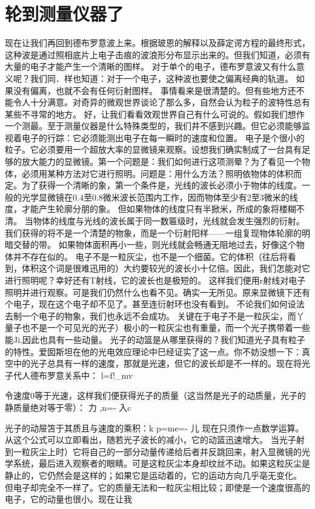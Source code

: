 \section{轮到测量仪器了}

现在让我们再回到德布罗意波上来。根据玻恩的解释以及薛定谔方程的最终形式，这种波是通过照相底片上电子击痕的波浪形分布显示出来的。但我们知道，必须有大量的电子才能产生一个清晰的图样。
对于单个的电子，德布罗意波又有什么意义呢？我们同．样也知道：对于一个电子，这种波也要使之偏离经典的轨道。
如果没有偏离，也就不会有任何衍射图样。
事情看来是很清楚的。但有些地方还不能令人十分满意。对奇异的微观世界谈论了那么多，自然会认为粒子的波特性总有某些不寻常的地方。
好，让我们看看效观世界自己有什么可说的。假如我们想作一个测最。至于测量仪器是什么特殊类型的，我们井不感到兴趣。但它必须能够监视着电子的行踪：它必须能测出电子在每一瞬时的速度和位置。
电子是个很小的粒子。它必须要用一个超放大率的显微镜来观察。设想我们确实制成了一台具有足够的放大能力的显微镜。第一个问题是：我们如何进行这项测晕？为了看见一个物体，必须用某种方法对它进行照明。问题是：用什么方法？照明依物体的体积而定。为了获得一个清晰的象，第一个条件是，光线的波长必须小于物体的线度。一般的光学显微镜在0.4至0.8微米波长范围内工作，因而物体至少有2至3微米的线度，才能产生轮廓分朋的象。
但如果物体的线度只有半掀米，所成的象将楼糊不清。
当物体的线度与光线的波长属于同一数匾级时，光线就会发生强烈的衍射。我们获得的将不是一个清楚的物象，而是一个衍射阳样——一组复现物体轮廓的明暗交替的带。
如果物体面积再小一些，则光线就会畅通无阻地过去，好像这个物体并不存在似的。
电子不是一粒灰尘，也不是一个细菌。它的体积（往后将看到，体积这个词是很难迅用的）大约要较光的波长小十亿倍。因此，我们怎能对它进行照明呢？幸好还有T射线，它的波长也是极短的。
这样我们便用r射线对电子照明并进行观察。可是我们仍然什么也看不见。确实一无所见。原来显微镜下还有个电子，现在这个电子却不见了。甚至连衍射环也没有看到。
不论我们如何设法去制一个电子的物象，我们也永远不会成功。
关键在于电子不是一粒灰尘，而丫量子也不是一个可见光的光子）极小的一粒灰尘也有重量，而一个光子携带着一些能Ji,因此也具有一些动量。
光子的动篮是从哪里获得的？我们知道光子具有粒子的特性。爱囡斯坦在他的光电效应理论中巳经证实了这一点。你不妨没想一下：真空中的光子总具有一样的速度，那就是光速，但它的波长却是不一样的。现在将光子代人德布罗意关系中：
l=f!_mv

令速度0等于光速，这样我们便获得光子的质量（这当然是光子的动质量，光子的静质量绝对等于零）：
力
,n=-
入c

光子的动屉笘于其质且与速度的乘积：k
p=me=-
儿
现在只须作一点数学运算。从这个公式可以立即看出，随若光子波长的减小，它的动篮迅速增大。
当光子射到一粒灰尘上时）它将自己的一部分动量传递给后者并反跳回来，射入显微镜的光学系统，最后进入观察者的眼睛。可是这粒灰尘本身却纹丝不动。如果这粒灰尘是静止的，它仍然会是这样的；如果它是运动着的，它的运动方向几乎亳无变化。
但电子却完全不一样了。它的质量无法和一粒灰尘相比较；即使是一个速度很高的电子，它的动量也很小。现在让我

